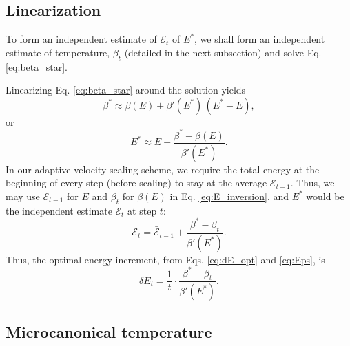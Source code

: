 \documentclass[reprint]{revtex4-1}
\begin{document}
\subsection{Linearization}



To form an independent estimate of
$\mathcal E_t$ of $E^*$,
%
we shall form
an independent estimate of temperature, $\beta_t$
(detailed in the next subsection)
and solve Eq. \eqref{eq:beta_star}.

Linearizing Eq. \eqref{eq:beta_star} around the solution
yields
%
\begin{equation*}
\beta^*
\approx
\beta( E )
+
\beta'( E^* ) \, ( E^* - E )
,
\end{equation*}
%
or
%
\begin{equation}
E^*
\approx
E
+
\frac{ \beta^* - \beta(E) }
     { \beta'(E^*) }
.
\label{eq:E_inversion}
\end{equation}
%
In our adaptive velocity scaling scheme,
we require the total energy at the beginning of every step
(before scaling) to stay at the average $\mathcal E_{t - 1}$.
%
Thus, we may use $\mathcal E_{t - 1}$ for $E$
and $\beta_t$ for $\beta(E)$
in Eq. \eqref{eq:E_inversion},
and $E^*$ would be the independent estimate
$\mathcal E_{t}$ at step $t$:
%
%
\begin{equation}
\mathcal E_t
=
\bar{\mathcal E}_{t - 1}
+
\frac{ \beta^* - \beta_t }
     { \beta'(E^*) }
.
\label{eq:Eps}
\end{equation}
%
Thus, the optimal energy increment,
from Eqs. \eqref{eq:dE_opt} and \eqref{eq:Eps},
is
%
\begin{equation}
\delta E_t
=
\frac{ 1 } { t }
\cdot
\frac{ \beta^* - \beta_t }
     { \beta'(E^*) }
.
\label{eq:dE_beta}
\end{equation}
%



\subsection{Microcanonical temperature}
\end{document}

